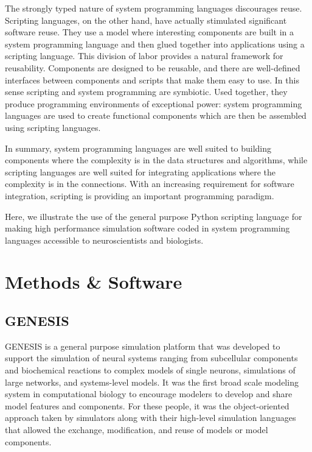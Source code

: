 \documentclass[12pt]{article}
\begin{document}
The strongly typed nature of system programming languages discourages
reuse. Scripting languages, on the other hand, have actually
stimulated significant software reuse. They use a model where
interesting components are built in a system programming language and
then glued together into applications using a scripting language.
This division of labor provides a natural framework for reusability.
Components are designed to be reusable, and there are well-defined
interfaces between components and scripts that make them easy to use.
In this sense scripting and system programming are symbiotic. Used
together, they produce programming environments of exceptional power:
system programming languages are used to create functional components
which are then be assembled using scripting languages.

In summary, system programming languages are well suited to building
components where the complexity is in the data structures and
algorithms, while scripting languages are well suited for integrating
applications where the complexity is in the connections. With an
increasing requirement for software integration, scripting is
providing an important programming paradigm.

Here, we illustrate the use of the general purpose Python scripting language
for making high performance simulation software coded in system
programming languages accessible to neuroscientists and biologists.




\section{Methods \& Software}

\subsection{GENESIS}

GENESIS is a general purpose simulation
platform that was developed to support the simulation of neural
systems ranging from subcellular components and biochemical reactions
to complex models of single neurons, simulations of large networks,
and systems-level models. It was the first broad scale modeling system
in computational biology to encourage modelers to develop and share
model features and components. For these people, it was the
object-oriented approach taken by simulators along with their
high-level simulation languages that allowed the exchange,
modification, and reuse of models or model
components. 
\end{document}
